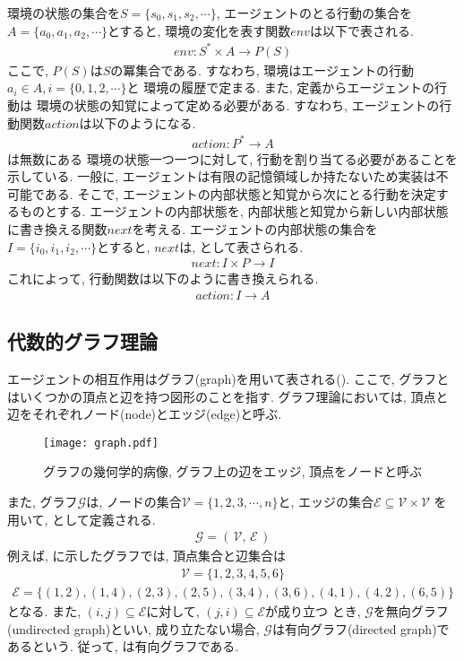 環境の状態の集合を$S=\{s_0, s_1, s_2, \cdots\}$, 
エージェントのとる行動の集合を$A=\{a_0, a_1, a_2, \cdots\}$とすると, 
環境の変化を表す関数$env$は以下で表される.
\begin{align}
  env: S^{*}\times A\rightarrow P(S)
\end{align} 
ここで, $P(S)$は$S$の冪集合である.
すなわち, 環境はエージェントの行動$a_i\in A, i=\{0, 1, 2, \cdots\}$と
環境の履歴で定まる.
また, 定義からエージェントの行動は
環境の状態の知覚によって定める必要がある.
すなわち, エージェントの行動関数$action$は以下のようになる.
\begin{align}
  action: P^{*}\rightarrow A
  \label{eq:action1}
\end{align}
は無数にある
環境の状態一つ一つに対して, 行動を割り当てる必要があることを示している.
一般に, エージェントは有限の記憶領域しか持たないため実装は不可能である.
そこで, エージェントの内部状態と知覚から次にとる行動を決定するものとする.
エージェントの内部状態を, 内部状態と知覚から新しい内部状態に書き換える関数$next$を考える. 
エージェントの内部状態の集合を$I=\{i_0, i_1, i_2, \cdots\}$とすると, 
$next$は, として表さられる.
\begin{align}
  next: I\times P \rightarrow I
  \label{eq:next}
\end{align}
これによって, 行動関数は以下のように書き換えられる.
\begin{align}
  action: I\rightarrow A
\end{align}
\subsection*{代数的グラフ理論}
エージェントの相互作用はグラフ(graph)を用いて表される().
ここで, グラフとはいくつかの頂点と辺を持つ図形のことを指す.
グラフ理論においては, 
頂点と辺をそれぞれノード(node)とエッジ(edge)と呼ぶ.
\begin{figure}[H]
  \centering
  \texttt{[image: graph.pdf]}
  \caption{グラフの幾何学的病像, グラフ上の辺をエッジ, 頂点をノードと呼ぶ}
  \label{fig:graph}
\end{figure}
また, グラフ$\mathcal{G}$は, 
ノードの集合$\mathcal{V}=\{1, 2, 3, \cdots, n\}$と, 
エッジの集合$\mathcal{E}\subseteq \mathcal{V}\times\mathcal{V}$
を用いて, として定義される.
\begin{align}
  \mathcal{G}=(\,\mathcal{V},\,\mathcal{E}\,)
  \label{eq:def.graph}
\end{align}
例えば, に示したグラフでは, 頂点集合と辺集合は
\begin{align}
  \mathcal{V}=\{1, 2, 3, 4, 5, 6\}
\end{align}
\begin{align}
  \mathcal{E}=\{(1, 2),(1, 4), (2, 3), (2, 5), (3, 4), (3, 6), (4, 1), (4, 2),(6, 5)\}
\end{align}
となる. 
また, $(i, j)\subseteq \mathcal{E}$に対して, $(j, i)\subseteq \mathcal{E}$が成り立つ
とき, $\mathcal{G}$を無向グラフ(undirected graph)といい, 
成り立たない場合, $\mathcal{G}$は有向グラフ(directed graph)であるという.
従って, は有向グラフである.

